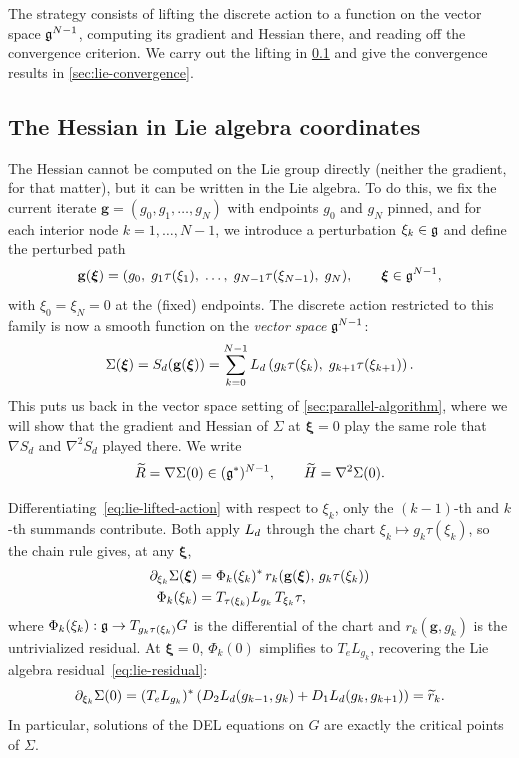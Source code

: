 The strategy consists of lifting the discrete action to a function on the vector space ${\mathfrak{g}}^{N-1}$, computing its gradient and Hessian there, and reading off the convergence criterion.
We carry out the lifting in \cref{sec:lie-hessian} and give the convergence results in \cref{sec:lie-convergence}.

\subsection{The Hessian in Lie algebra coordinates}\label{sec:lie-hessian}

The Hessian cannot be computed on the Lie group directly (neither the gradient, for that matter), but it can be written in the Lie algebra. To do this, we fix the current iterate $\mathbf{g} = (g_0, g_1, \ldots, g_N)$ with endpoints $g_0$ and $g_N$ pinned, and for each interior node $k = 1, \ldots, N-1$, we introduce a perturbation $\xi_k \in {\mathfrak{g}}$ and define the perturbed path
\[
	\mathbf{g}(\boldsymbol \xi) = (g_0,\; g_1\tau(\xi_1),\; \ldots,\; g_{N-1}\tau(\xi_{N-1}),\; g_N),
	\qquad \boldsymbol \xi \in {\mathfrak{g}}^{N-1},
\]
with $\xi_0 = \xi_N = 0$ at the (fixed) endpoints.
The discrete action restricted to this family is now a smooth function on the \emph{vector space} ${\mathfrak{g}}^{N-1}$:
\begin{equation}
	\Sigma(\boldsymbol \xi) = S_d(\mathbf{g}(\boldsymbol \xi))
	= \sum_{k=0}^{N-1} L_d\left(g_k\tau(\xi_k),\; g_{k+1}\tau(\xi_{k+1})\right).
	\label{eq:lie-lifted-action}
\end{equation}
This puts us back in the vector space setting of \cref{sec:parallel-algorithm}, where we will show that the gradient and Hessian of $\Sigma$ at $\boldsymbol \xi = 0$ play the same role that $\nabla S_d$ and $\nabla^2 S_d$ played there.
We write
\[
	\widetilde{R} = \nabla \Sigma(0) \in ({\mathfrak{g}}^*)^{N-1},
	\qquad
	\widetilde{H} = \nabla^2 \Sigma(0).
\]

Differentiating~\eqref{eq:lie-lifted-action} with respect to $\xi_k$, only the $(k-1)$-th and $k$-th summands contribute. Both apply $L_d$ through the chart $\xi_k \mapsto g_k\tau(\xi_k)$, so the chain rule gives, at any $\boldsymbol\xi$,
\begin{equation}
\begin{aligned}
	\pdv{\Sigma}!{\xi_k}(\boldsymbol\xi) &= \Phi_k(\xi_k)^*\, r_k\!\left(\mathbf{g}(\boldsymbol\xi),\, g_k\tau(\xi_k)\right) \\
	\Phi_k(\xi_k) &= T_{\tau(\xi_k)}L_{g_k}\, T_{\xi_k}\tau,
\end{aligned}
\label{eq:lie-gradient-general}
\end{equation}
where $\Phi_k(\xi_k) : {\mathfrak{g}} \to T_{g_k\tau(\xi_k)}G$ is the differential of the chart and $r_k(\mathbf{g}, g_k)$ is the untrivialized residual. At $\boldsymbol \xi = 0$, $\Phi_k(0)$ simplifies to $T_e L_{g_k}$, recovering the Lie algebra residual~\eqref{eq:lie-residual}:
\[
	\pdv{\Sigma}!{\xi_k}(0)
	= (T_e L_{g_k})^* \left(D_{2} L_d(g_{k-1}, g_k) + D_{1} L_d(g_k, g_{k+1})\right)
	= \widetilde{r}_k.
\]
In particular, solutions of the DEL equations on $G$ are exactly the critical points of $\Sigma$.

